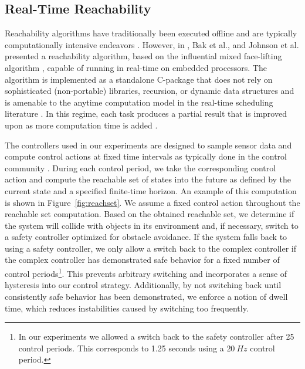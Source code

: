 \documentclass[manuscript,screen,review]{acmart}
\newcommand{\figref}[1]{Figure~\ref{#1}}
\begin{document}
\subsection{Real-Time Reachability}

Reachability algorithms have traditionally been executed offline and are typically computationally intensive endeavors \cite{Chen2013,AlthoffCORA2015,manzanas2019arch_ainncs}. However, in \cite{Bak2014,Johnson2016}, Bak et al., and Johnson et al. presented a reachability algorithm, based on the influential mixed face-lifting algorithm \cite{dang2000}, capable of running in real-time on embedded processors. The algorithm is implemented as a standalone C-package that does not rely on sophisticated (non-portable) libraries, recursion, or dynamic data structures and is amenable to the anytime computation model in the real-time scheduling literature \cite{Liu1991}. In this regime, each task produces a partial result that is improved upon as more computation time is added \cite{Johnson2016}. 

The controllers used in our experiments are designed to sample sensor data and compute control actions at fixed time intervals as typically done in the control community \cite{Dai2020}. During each control period, we take the corresponding control action and compute the reachable set of states into the future as defined by the current state and a specified finite-time horizon. An example of this computation is shown in \figref{fig:reachset}. We assume a fixed control action throughout the reachable set computation. Based on the obtained reachable set, we determine if the system will collide with objects in its environment and, if necessary, switch to a safety controller optimized for obstacle avoidance. If the system falls back to using a safety controller, we only allow a switch back to the complex controller if the complex controller has demonstrated safe behavior for a fixed number of control periods\footnote{In our experiments we allowed a switch back to the safety controller after 25 control periods. This corresponds to 1.25 seconds using a $20\ Hz$ control period.}. This prevents arbitrary switching and incorporates a sense of hysteresis into our control strategy. Additionally, by not switching back until consistently safe behavior has been demonstrated, we enforce a notion of dwell time, which reduces instabilities caused by switching too frequently. %
\end{document}
